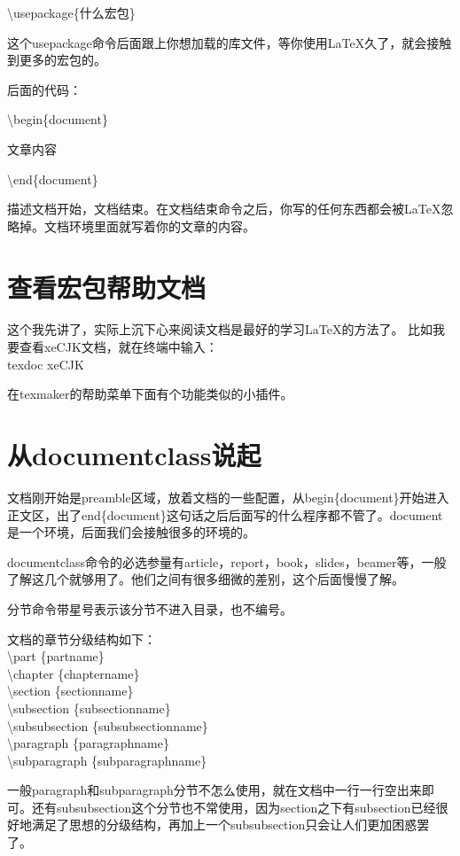 \documentclass[11pt,oneside]{book}
\begin{document}
\begin{common-format}
\textbackslash usepackage\{什么宏包\}

这个usepackage命令后面跟上你想加载的库文件，等你使用\LaTeX 久了，就会接触到更多的宏包的。

后面的代码：

\textbackslash begin\{document\}

文章内容

\textbackslash end\{document\}

描述文档开始，文档结束。在文档结束命令之后，你写的任何东西都会被\LaTeX 忽略掉。文档环境里面就写着你的文章的内容。

\section{查看宏包帮助文档}
这个我先讲了，实际上沉下心来阅读文档是最好的学习\LaTeX 的方法了。
比如我要查看xeCJK文档，就在终端中输入：\\
texdoc xeCJK

在texmaker的帮助菜单下面有个功能类似的小插件。

\section{从documentclass说起}
\label{sec:documentclass}
文档刚开始是preamble区域，放着文档的一些配置，从begin\{document\}开始进入正文区，出了end\{document\}这句话之后后面写的什么程序都不管了。document是一个环境，后面我们会接触很多的环境的。

documentclass命令的必选参量有article，report，book，\linebreak slides，beamer等，一般了解这几个就够用了。他们之间有很多细微的差别，这个后面慢慢了解。

分节命令带星号表示该分节不进入目录，也不编号。

文档的章节分级结构如下：\\
\textbackslash part \{partname\}\\
\textbackslash chapter \{chaptername\}\\
\textbackslash section \{sectionname\}\\
\textbackslash subsection \{subsectionname\}\\
\textbackslash subsubsection \{subsubsectionname\}\\
\textbackslash paragraph \{paragraphname\}\\
\textbackslash subparagraph \{subparagraphname\}

一般paragraph和subparagraph分节不怎么使用，就在文档中一行一行空出来即可。还有subsubsection这个分节也不常使用，因为section之下有subsection已经很好地满足了思想的分级结构，再加上一个subsubsection只会让人们更加困惑罢了。


\end{common-format}
\end{document}
